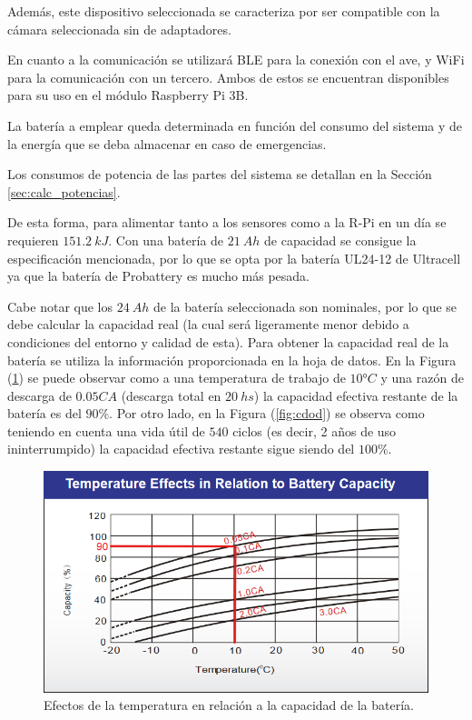 Además, este dispositivo seleccionada se caracteriza por ser compatible con la cámara seleccionada sin  de adaptadores.


En cuanto a la comunicación se utilizará BLE para la conexión con el ave, y WiFi para la comunicación con un tercero.
Ambos de estos se encuentran disponibles para su uso en el módulo Raspberry Pi 3B.



La batería a emplear queda determinada en función del consumo del sistema y de la energía que se deba almacenar en caso de emergencias. 

Los consumos de potencia de las partes del sistema se detallan en la Sección \ref{sec:calc_potencias}.

De esta forma, para alimentar tanto a los sensores como a la R-Pi en un día se requieren $151.2 \ kJ$. Con una batería de $21 \ Ah$ de capacidad se consigue la especificación mencionada, por lo que se opta por la batería UL24-12 de Ultracell ya que la batería de Probattery es mucho más pesada.

Cabe notar que los $24 \ Ah$ de la batería seleccionada son nominales, por lo que se debe calcular la capacidad real (la cual será ligeramente menor debido a condiciones del entorno y calidad de esta). Para obtener la capacidad real de la batería se utiliza la información proporcionada en la hoja de datos. En la Figura (\ref{fig:ctemp}) se puede observar como a una temperatura de trabajo de $10°C$ y una razón de descarga de $0.05CA$ (descarga total en $20 \ hs$) la capacidad efectiva restante de la batería es del $90\% $. Por otro lado, en la Figura (\ref{fig:cdod}) se observa como teniendo en cuenta una vida útil de $540$ ciclos (es decir, 2 años de uso ininterrumpido) la capacidad efectiva restante sigue siendo del $100\%$.
 
\begin{figure}[H]
	\centering
	\includegraphics[width=0.9\linewidth]{ImagenesFactibilidad/UL24-12_Ctemp}	
	\caption{Efectos de la temperatura en relación a la capacidad de la batería.}
	\label{fig:ctemp}
\end{figure}

